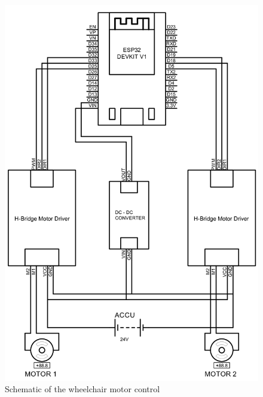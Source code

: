 \begin{figure} [!ht] \centering
  \includegraphics[scale=0.24]{gambar/bab3/Schematics.png}
  \caption{Schematic of the wheelchair motor control}
  \label{fig:Skematik Alat}
\end{figure}

